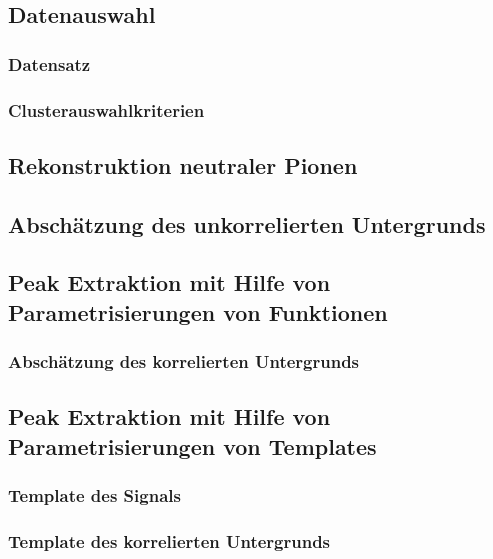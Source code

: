 \documentclass[11pt]{article}
\begin{document}
\subsection{Datenauswahl} \label{s3s1}

\subsubsection{Datensatz} \label{s3s1s1}

\subsubsection{Clusterauswahlkriterien} \label{s3s1s2}

\subsection{Rekonstruktion neutraler Pionen} \label{s3s2}
%

\subsection{Absch{\"a}tzung des unkorrelierten Untergrunds} \label{s3s3}
%
\subsection{Peak Extraktion mit Hilfe von Parametrisierungen von Funktionen} \label{s3s4}

\subsubsection{Absch{\"a}tzung des korrelierten Untergrunds} \label{s3s4s1}

\subsection{Peak Extraktion mit Hilfe von Parametrisierungen von Templates} \label{s3s5}

\subsubsection{Template des Signals} \label{s3s5s1}

\subsubsection{Template des korrelierten Untergrunds} \label{s3s5s2}
\end{document}
